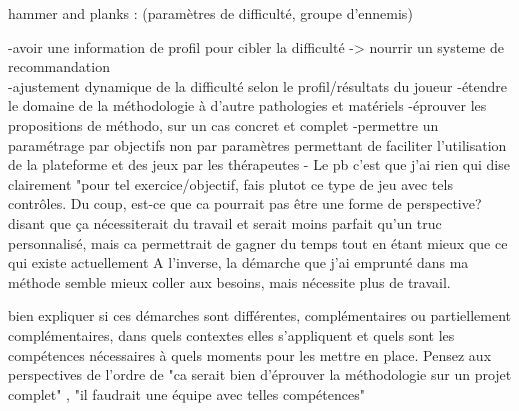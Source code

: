 	hammer and planks : (paramètres de difficulté, groupe d'ennemis)\newline
	
	-avoir une information de profil pour cibler la difficulté -> nourrir un systeme de recommandation\\
	-ajustement dynamique de la difficulté selon le profil/résultats du joueur\newline
	-étendre le domaine de la méthodologie à d'autre pathologies et matériels\newline
	-éprouver les propositions de méthodo, sur un cas concret et complet\newline
	-permettre un paramétrage par objectifs non par paramètres permettant de faciliter l'utilisation de la plateforme et des jeux par les thérapeutes \newline
	- Le pb c'est que j'ai rien qui dise clairement "pour tel exercice/objectif, fais plutot ce type de jeu avec tels contrôles. Du coup, est-ce que ca pourrait pas être une forme de perspective? disant que ça nécessiterait du travail et serait moins parfait qu'un truc personnalisé, mais ca permettrait de gagner du temps tout en étant mieux que ce qui existe actuellement
	A l'inverse, la démarche que j'ai emprunté dans ma méthode semble mieux coller aux besoins, mais nécessite plus de travail.
 
 bien expliquer si ces démarches sont différentes, complémentaires ou partiellement complémentaires, dans quels contextes elles s'appliquent et quels sont les compétences nécessaires à quels moments pour les mettre en place.
 Pensez aux perspectives de l'ordre de "ca serait bien d'éprouver la méthodologie sur un projet complet" , "il faudrait une équipe avec telles compétences"